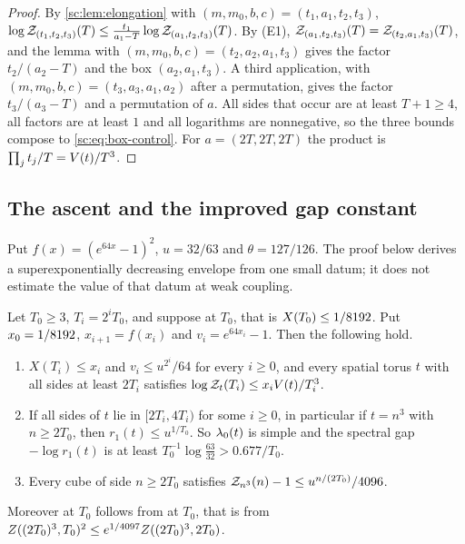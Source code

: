 \begin{proof}
By \cref{sc:lem:elongation} with $(m,m_0,b,c)=(t_1,a_1,t_2,t_3)$, $\log\mathcal Z_{(t_1,t_2,t_3)}(T)\le\frac{t_1}{a_1-T}\log\mathcal Z_{(a_1,t_2,t_3)}(T)$. By (E1), $\mathcal Z_{(a_1,t_2,t_3)}(T)=\mathcal Z_{(t_2,a_1,t_3)}(T)$, and the lemma with $(m,m_0,b,c)=(t_2,a_2,a_1,t_3)$ gives the factor $t_2/(a_2-T)$ and the box $(a_2,a_1,t_3)$. A third application, with $(m,m_0,b,c)=(t_3,a_3,a_1,a_2)$ after a permutation, gives the factor $t_3/(a_3-T)$ and a permutation of $a$. All sides that occur are at least $T+1\ge4$, all factors are at least $1$ and all logarithms are nonnegative, so the three bounds compose to \eqref{sc:eq:box-control}. For $a=(2T,2T,2T)$ the product is $\prod_jt_j/T=V(t)/T^3$.
\end{proof}
\subsection{The ascent and the improved gap constant}
Put $f(x)=(e^{64x}-1)^2$, $u=32/63$ and $\theta=127/126$.
The proof below derives a superexponentially decreasing envelope from one
small datum; it does not estimate the value of that datum at weak coupling.
\begin{theorem}\label{sc:thm:ascent}
Let $T_0\ge3$, $T_i=2^iT_0$, and suppose \Bcirc{} at $T_0$, that is $X(T_0)\le1/8192$. Put $x_0=1/8192$, $x_{i+1}=f(x_i)$ and $v_i=e^{64x_i}-1$. Then the following hold.
\begin{enumerate}[label=(\alph*)]
\item $X(T_i)\le x_i$ and $v_i\le u^{2^i}/64$ for every $i\ge0$, and every spatial torus $t$ with all sides at least $2T_i$ satisfies $\log\mathcal Z_{t}(T_i)\le x_iV(t)/T_i^3$.
\item If all sides of $t$ lie in $[2T_i,4T_i)$ for some $i\ge0$, in particular if $t=n^3$ with $n\ge2T_0$, then $r_1(t)\le u^{1/T_0}$. So $\lambda_0(t)$ is simple and the spectral gap $-\log r_1(t)$ is at least $T_0^{-1}\log\frac{63}{32}>0.677/T_0$.
\item Every cube of side $n\ge2T_0$ satisfies $\mathcal Z_{n^3}(n)-1\le u^{n/(2T_0)}/4096$.
\end{enumerate}
Moreover \Bcirc{} at $T_0$ follows from \Mcirc{} at $T_0$, that is from $Z((2T_0)^3,T_0)^2\le e^{1/4097}Z((2T_0)^3,2T_0)$.
\end{theorem}

